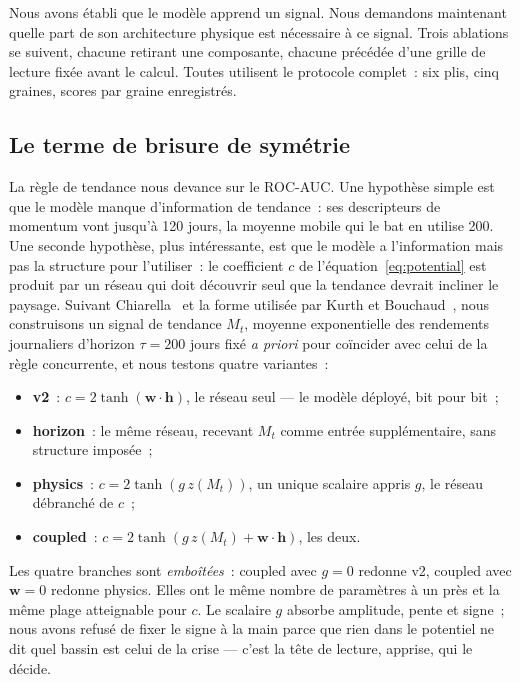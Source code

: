 \documentclass[11pt,a4paper]{article}
\begin{document}
Nous avons établi que le modèle apprend un signal. Nous demandons maintenant quelle part de son architecture physique est nécessaire à ce signal. Trois ablations se suivent, chacune retirant une composante, chacune précédée d'une grille de lecture fixée avant le calcul. Toutes utilisent le protocole complet~: six plis, cinq graines, scores par graine enregistrés.

\subsection{Le terme de brisure de symétrie}
\label{sec:tilt}

La règle de tendance nous devance sur le ROC-AUC. Une hypothèse simple est que le modèle manque d'information de tendance~: ses descripteurs de momentum vont jusqu'à 120 jours, la moyenne mobile qui le bat en utilise 200. Une seconde hypothèse, plus intéressante, est que le modèle a l'information mais pas la structure pour l'utiliser~: le coefficient $c$ de l'équation~\eqref{eq:potential} est produit par un réseau qui doit découvrir seul que la tendance devrait incliner le paysage. Suivant Chiarella~\cite{chiarella1992} et la forme utilisée par Kurth et Bouchaud~\cite{kurth2025chiarella}, nous construisons un signal de tendance $M_t$, moyenne exponentielle des rendements journaliers d'horizon $\tau=200$ jours fixé \emph{a priori} pour coïncider avec celui de la règle concurrente, et nous testons quatre variantes~:
\begin{itemize}\setlength\itemsep{0pt}
\item \textbf{v2}~: $c = 2\tanh(\mathbf w\cdot\mathbf h)$, le réseau seul --- le modèle déployé, bit pour bit~;
\item \textbf{horizon}~: le même réseau, recevant $M_t$ comme entrée supplémentaire, sans structure imposée~;
\item \textbf{physics}~: $c = 2\tanh(g\,z(M_t))$, un unique scalaire appris $g$, le réseau débranché de $c$~;
\item \textbf{coupled}~: $c = 2\tanh(g\,z(M_t) + \mathbf w\cdot\mathbf h)$, les deux.
\end{itemize}
Les quatre branches sont \emph{emboîtées}~: coupled avec $g=0$ redonne v2, coupled avec $\mathbf w=0$ redonne physics. Elles ont le même nombre de paramètres à un près et la même plage atteignable pour $c$. Le scalaire $g$ absorbe amplitude, pente et signe~; nous avons refusé de fixer le signe à la main parce que rien dans le potentiel ne dit quel bassin est celui de la crise --- c'est la tête de lecture, apprise, qui le décide.
\end{document}
